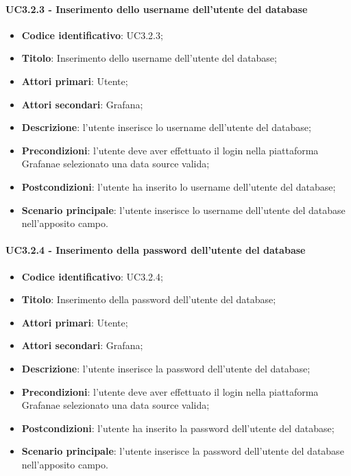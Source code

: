         \paragraph{UC3.2.3 - Inserimento dello username dell'utente del database}
            \begin{itemize}
                \item \textbf{Codice identificativo}: UC3.2.3;
                \item \textbf{Titolo}: Inserimento dello username dell'utente del database;
                \item \textbf{Attori primari}: Utente;
                \item \textbf{Attori secondari}: Grafana\glo;
                \item \textbf{Descrizione}: l'utente inserisce lo username dell'utente del database;
                \item \textbf{Precondizioni}: l'utente deve aver effettuato il login nella piattaforma Grafana\glosp e selezionato una data source valida;
                \item \textbf{Postcondizioni}: l'utente ha inserito lo username dell'utente del database;
                \item \textbf{Scenario principale}: l'utente inserisce lo username dell'utente del database nell'apposito campo.
            \end{itemize}
        \paragraph{UC3.2.4 - Inserimento della password dell'utente del database}
            \begin{itemize}
                \item \textbf{Codice identificativo}: UC3.2.4;
                \item \textbf{Titolo}: Inserimento della password dell'utente del database;
                \item \textbf{Attori primari}: Utente;
                \item \textbf{Attori secondari}: Grafana\glo;
                \item \textbf{Descrizione}: l'utente inserisce la password dell'utente del database;
                \item \textbf{Precondizioni}: l'utente deve aver effettuato il login nella piattaforma Grafana\glosp e selezionato una data source valida;
                \item \textbf{Postcondizioni}: l'utente ha inserito la password dell'utente del database;
                \item \textbf{Scenario principale}: l'utente inserisce la password dell'utente del database nell'apposito campo.
            \end{itemize}

